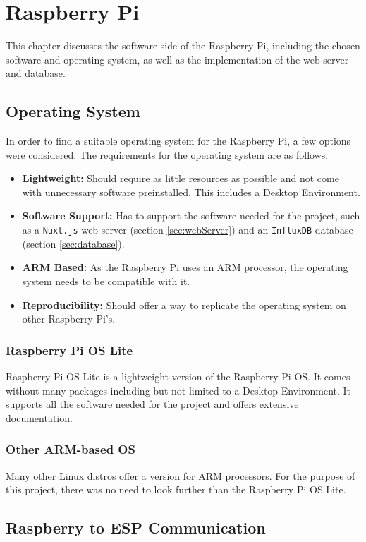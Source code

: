 \chapter{Raspberry Pi}  \label{sec:raspberry_pi}
This chapter discusses the software side of the Raspberry Pi,
including the chosen software and operating system, as well 
as the implementation of the web server and database.
    \section{Operating System}
    In order to find a suitable operating system for the Raspberry Pi, a few options
    were considered. The requirements for the operating system are as follows:
    \begin{itemize}
        \item \textbf{Lightweight:} Should require as little resources as possible
        and not come with unnecessary software preinstalled. This includes a Desktop 
        Environment.
        \item \textbf{Software Support:} Has to support the software needed for the
        project, such as a \texttt{Nuxt.js} web server (section \ref{sec:webServer})
        and an \texttt{InfluxDB} database (section \ref{sec:database}).
        \item \textbf{ARM Based:} As the Raspberry Pi uses an ARM processor, the
        operating system needs to be compatible with it.
        \item \textbf{Reproducibility:} Should offer a way to replicate the operating
        system on other Raspberry Pi's.
    \end{itemize}
        \subsection{Raspberry Pi OS Lite}
        Raspberry Pi OS Lite is a lightweight version of the Raspberry Pi OS. It
        comes without many packages including but not limited to a Desktop Environment.
        It supports all the software needed for the project and offers extensive documentation.
        \subsection{Other ARM-based OS}
        Many other Linux distros offer a version for ARM processors. For the purpose of
        this project, there was no need to look further than the Raspberry Pi OS Lite.
    \section{Raspberry to ESP Communication}
